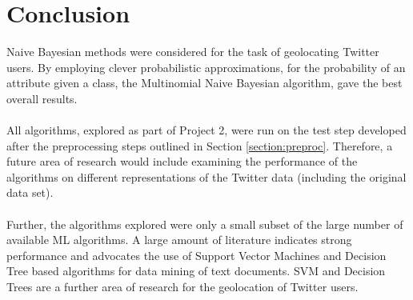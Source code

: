 \documentclass[11pt]{article}
\begin{document}
\section{Conclusion}

Naive Bayesian methods were considered for the task of geolocating Twitter users. By employing clever probabilistic approximations, for the probability of an attribute given a class, the Multinomial Naive Bayesian algorithm, gave the best overall results.\\\\
All algorithms, explored as part of Project 2, were run on the test step developed after the preprocessing steps outlined in Section \ref{section:preproc}. Therefore, a future area of research would include examining the performance of the algorithms on different representations of the Twitter data (including the original data set).\\\\
Further, the algorithms explored were only a small subset of the large number of available ML algorithms. A large amount of literature indicates strong performance and advocates the use of Support Vector Machines \cite{kib-svm-bayes} and Decision Tree based algorithms for data mining of text documents. SVM and Decision Trees are a further area of research for the geolocation of Twitter users.



\end{document}
